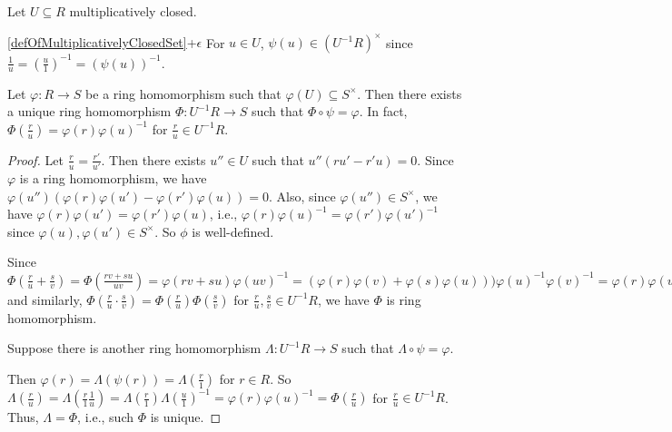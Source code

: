 \noindent Let $U \subseteq R$ multiplicatively closed.

\begin{customrecall}{\ref{defOfMultiplicativelyClosedSet}+$\epsilon$}
    For $u \in U$, $\psi(u) \in (U^{-1}R)^{\times}$ since $\frac{1}{u} = (\frac{u}{1})^{-1} = (\psi(u))^{-1}$.
\end{customrecall}

\begin{proposition}
    Let $\varphi: R \to S$ be a ring homomorphism such that $\varphi(U) \subseteq S^{\times}$. Then there exists a unique ring homomorphism $\Phi:U^{-1}R \to S$ such that $\Phi \circ \psi = \varphi$. In fact, $\Phi(\frac{r}{u}) = \varphi(r)\varphi(u)^{-1}$ for $\frac{r}{u} \in U^{-1}R$.
    \begin{center}
    \end{center}
\end{proposition}

\begin{proof}
    Let $\frac{r}{u} = \frac{r'}{u'}$. Then there exists $u'' \in U$ such that $u''(ru'-r'u) = 0$. Since $\varphi$ is a ring homomorphism, we have $\varphi(u'')(\varphi(r)\varphi(u') - \varphi(r')\varphi(u)) = 0$. Also, since $\varphi(u'') \in S^{\times}$, we have $\varphi(r)\varphi(u') = \varphi(r')\varphi(u)$, i.e., $\varphi(r)\varphi(u)^{-1} = \varphi(r')\varphi(u')^{-1}$ since $\varphi(u), \varphi(u') \in S^{\times}$. So $\phi$ is well-defined. \par
    Since $\Phi(\frac{r}{u} + \frac{s}{v}) = \Phi(\frac{rv+su}{uv}) = \varphi(rv+su)\varphi(uv)^{-1} = (\varphi(r)\varphi(v) + \varphi(s)\varphi(u))) \varphi(u)^{-1}\varphi(v)^{-1} = \varphi(r)\varphi(u)^{-1} + \varphi(s)\varphi(v)^{-1} = \Phi(\frac{r}{u}) + \Phi(\frac{s}{v})$ and similarly, $\Phi(\frac{r}{u} \cdot \frac{s}{v}) = \Phi(\frac{r}{u})\Phi(\frac{s}{v})$ for $\frac{r}{u},\frac{s}{v} \in U^{-1}R$, we have $\Phi$ is ring homomorphism. \par 
    Suppose there is another ring homomorphism $\Lambda: U^{-1}R \to S$ such that $\Lambda \circ \psi = \varphi$.
    \begin{center}
    \end{center}
    Then $\varphi(r) = \Lambda (\psi(r)) = \Lambda (\frac{r}{1})$ for $r \in R$. So $\Lambda(\frac{r}{u}) = \Lambda(\frac{r}{1} \frac{1}{u}) = \Lambda(\frac{r}{1}) \Lambda(\frac{u}{1})^{-1} = \varphi(r) \varphi(u)^{-1} = \Phi(\frac{r}{u})$ for $\frac{r}{u} \in U^{-1}R$. Thus, $\Lambda = \Phi$, i.e., such $\Phi$ is unique.
\end{proof}

